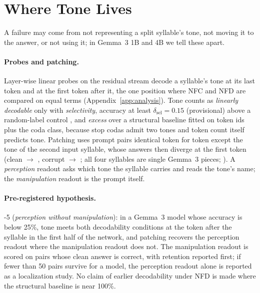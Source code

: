 \section{Where Tone Lives}
\label{sec:tone}

A  failure may come from not representing a split syllable's tone, not moving it to the answer, or not using it; in Gemma~3 1B and 4B we tell these apart.

\paragraph{Probes and patching.}
Layer-wise linear probes on the residual stream decode a syllable's tone at its last token and at the first token after it, the one position where NFC and NFD are compared on equal terms (Appendix~\ref{app:analysis}). Tone counts as \emph{linearly decodable} only with \emph{selectivity}, accuracy at least $\delta_{\mathrm{sel}} = 0.15$ (provisional) above a random-label control \citep{D19-1275}, and \emph{excess} over a structural baseline fitted on token ids plus the coda class, because stop codas admit two tones and token count itself predicts tone. Patching \citep{meng-etal-2022-locating,heimersheim-nanda-2024-use} uses prompt pairs identical token for token except the tone of the second input syllable, whose  answers then diverge at the first token (clean  $\rightarrow$ , corrupt  $\rightarrow$ ; all four syllables are single Gemma~3 pieces; ). A \emph{perception} readout asks which tone the syllable carries and reads the tone's name; the \emph{manipulation} readout is the  prompt itself.

\paragraph{Pre-registered hypothesis.}
\hyp{5} (\emph{perception without manipulation}): in a Gemma~3 model whose  accuracy is below 25\%, tone meets both decodability conditions at the token after the syllable in the first half of the network, and patching recovers the perception readout where the manipulation readout does not. The manipulation readout is scored on pairs whose clean answer is correct, with retention reported first; if fewer than 50 pairs survive for a model, the perception readout alone is reported as a localization study. No claim of earlier decodability under NFD is made where the structural baseline is near 100\%.

